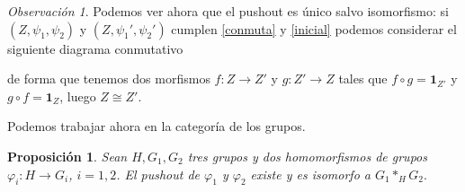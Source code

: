 \documentclass[12pt,a4paper]{book}
\newtheorem{prop}[thm]{Proposición}
\theoremstyle{definition} \newtheorem{defn}[thm]{Definición}
\theoremstyle{definition} \newtheorem{ejemplo}[thm]{Ejemplo}
\theoremstyle{definition} \newtheorem{ejercicio}[thm]{Ejercicio}
\theoremstyle{remark} \newtheorem*{obs}{Observación}
\begin{document}
\begin{obs}
Podemos ver ahora que el pushout es único salvo isomorfismo: si $(Z, \psi_1, \psi_2)$ y $(Z,\psi_1',\psi_2')$ cumplen \ref{conmuta} y \ref{inicial} podemos considerar el siguiente diagrama conmutativo
    \begin{center}
  \end{center}
de forma que tenemos dos morfismos $f:Z\rightarrow Z'$ y $g:Z'\rightarrow Z$ tales que $f\circ g= \mathbf{1}_{Z'}$ y $g\circ f=\mathbf{1}_{Z}$, luego $Z\cong Z'$.
\end{obs}

Podemos trabajar ahora en la categoría de los grupos. 
\begin{prop}
Sean $H, G_1, G_2$ tres grupos y dos homomorfismos de grupos $\varphi_i:H \rightarrow G_i$, $i=1,2$. El pushout de $\varphi_1$ y $\varphi_2$ existe y es isomorfo a 
$
  G_1*_H G_2.
  $
\end{prop}
\end{document}
